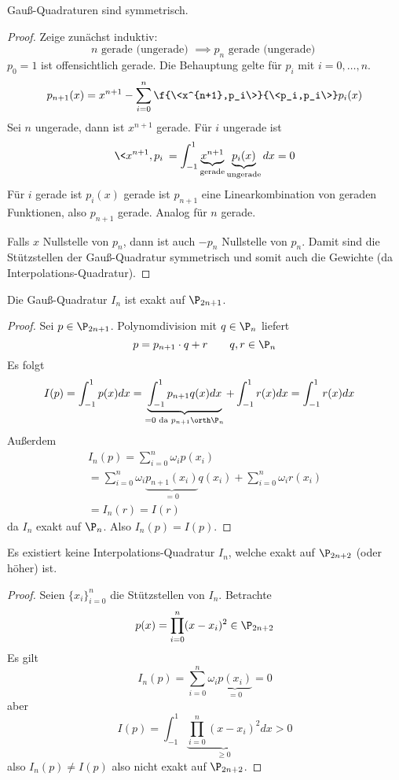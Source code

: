 \documentclass[11pt]{scrbook}
\begin{document}
\begin{st}[Symmetrie]
	\label{2.20}
	Gauß-Quadraturen sind symmetrisch.
	\begin{proof}
		Zeige zunächst induktiv: 
		\[
			n \text{ gerade (ungerade) } \implies p_n \text{ gerade (ungerade) }
		\]
		$p_0 = 1$ ist offensichtlich gerade.
		Die Behauptung gelte für $p_i$ mit $i=0,\dotsc,n$.
		\[
			p_{n+1}(x) = x^{n+1} - \sum_{i=0}^n \f{\<x^{n+1},p_i\>}{\<p_i,p_i\>} p_i(x)
		\]
		Sei $n$ ungerade, dann ist $x^{n+1}$ gerade.
		Für $i$ ungerade ist
		\[
			\<x^{n+1},p_i\> = \int_{-1}^1 \underbrace{x^{n+1}}_{\text{gerade}} \underbrace{p_i(x)}_{\text{ungerade}} dx = 0
		\]
		Für $i$ gerade ist $p_i(x)$ gerade ist $p_{n+1}$ eine Linearkombination von geraden Funktionen, also $p_{n+1}$ gerade.
		Analog für $n$ gerade.

		Falls $x$ Nullstelle von $p_n$, dann ist auch $-p_n$ Nullstelle von $p_n$.
		Damit sind die Stützstellen der Gauß-Quadratur symmetrisch und somit auch die Gewichte (da Interpolations-Quadratur).
	\end{proof}
\end{st}

\begin{st}[Exaktheit]
	\label{2.21}
	Die Gauß-Quadratur $I_n$ ist exakt auf $\P_{2n+1}$.
	\begin{proof}
		Sei $p\in \P_{2n+1}$.
		Polynomdivision mit $q\in \P_n$ liefert
		\[
			p= p_{n+1} \cdot q + r \qquad  q,r\in \P_n
		\]
		Es folgt
		\begin{align*}
			I(p) 
			&= \int_{-1}^1 p(x) dx 
			= \underbrace{\int_{-1}^1 p_{n+1}q(x) dx}_{=0 \text{ da $p_{n+1}\orth \P_n$}} + \int_{-1}^1 r(x) dx
			= \int_{-1}^1 r(x) dx 
		\end{align*}
		Außerdem
		\begin{align*}
			I_n(p) 
			= \sum_{i=0}^n \omega_i p(x_i) \\
			= \sum_{i=0}^n \omega_i \underbrace{p_{n+1}(x_i)}_{=0} q(x_i) + \sum_{i=0}^n \omega_i r(x_i) \\
			= I_n(r) = I(r)
		\end{align*}
		da $I_n$ exakt auf $\P_n$.
		Also $I_n(p) = I(p)$.
	\end{proof}
\end{st}

\begin{st}
	\label{2.22}
	Es existiert keine Interpolations-Quadratur $I_n$, welche exakt auf $\P_{2n+2}$ (oder höher) ist.
	\begin{proof}
		Seien $\{x_i\}_{i=0}^n$ die Stützstellen von $I_n$.
		Betrachte 
		\[
			p(x) = \prod_{i=0}^n (x-x_i)^2 \in \P_{2n+2}
		\]
		Es gilt
		\[
			I_n(p) = \sum_{i=0}^n \omega_i \underbrace{p(x_i)}_{=0} = 0
		\]
		aber
		\[
			I(p) = \int_{-1}^1 \underbrace{\prod_{i=0}^n (x-x_i)^2 }_{\ge 0} dx > 0
		\]
		also $I_n(p) \neq I(p)$ also nicht exakt auf $\P_{2n+2}$.
	\end{proof}
\end{st}
\end{document}

